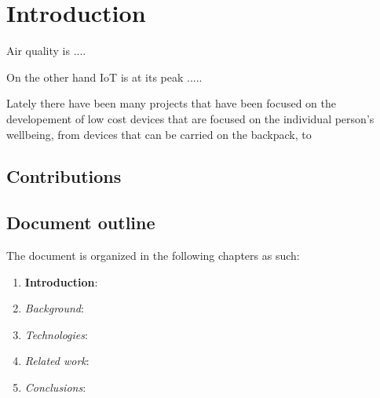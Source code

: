 
\chapter{Introduction}\label{chapter:introduction}

	Air quality is .... 
	
	
	On the other hand IoT is at its peak ..... 
	
	
	Lately there have been many projects that have been focused on the developement of low cost devices that are focused on the individual person's wellbeing, from devices that can be carried on the backpack, to 
	
	
	\section{Contributions}\label{sec:contributions}
	
	\section{Document outline}\label{sec:document_outline}
	
	
		The document is organized in the following chapters as such:
		
		\begin{enumerate}
			
			\item \textbf{Introduction}:
			\item \textit{Background}:
			\item \textit{Technologies}:
			\item \textit{Related work}:
			\item \textit{Conclusions}:
			
		\end{enumerate}